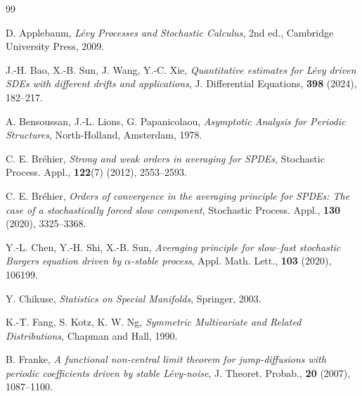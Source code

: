 \documentclass[11pt,reqno]{amsart}
\numberwithin{equation}{section}
\begin{document}
\begin{thebibliography}{99}
	
	
	 D. Applebaum, \textit{Lévy Processes and Stochastic Calculus}, 2nd ed., Cambridge University Press, 2009.
	
	 J.-H. Bao, X.-B. Sun, J. Wang, Y.-C. Xie, \textit{Quantitative estimates for Lévy driven SDEs with different drifts and applications}, J. Differential Equations, \textbf{398} (2024), 182–217.
	
	 A. Bensoussan, J.-L. Lions, G. Papanicolaou, \textit{Asymptotic Analysis for Periodic Structures}, North-Holland, Amsterdam, 1978.
	
	 C. E. Bréhier, \textit{Strong and weak orders in averaging for SPDEs}, Stochastic Process. Appl., \textbf{122}(7) (2012), 2553–2593.
	
	 C. E. Bréhier, \textit{Orders of convergence in the averaging principle for SPDEs: The case of a stochastically forced slow component}, Stochastic Process. Appl., \textbf{130} (2020), 3325–3368.
	
	
	 Y.-L. Chen, Y.-H. Shi, X.-B. Sun, \textit{Averaging principle for slow–fast stochastic Burgers equation driven by $\alpha$-stable process}, Appl. Math. Lett., \textbf{103} (2020), 106199.
	
	 Y. Chikuse, \textit{Statistics on Special Manifolds}, Springer, 2003.
	
	
	 K.-T. Fang, S. Kotz, K. W. Ng, \textit{Symmetric Multivariate and Related Distributions}, Chapman and Hall, 1990.
	
	 B. Franke, \textit{A functional non-central limit theorem for jump-diffusions with periodic coefficients driven by stable Lévy-noise}, J. Theoret. Probab., \textbf{20} (2007), 1087–1100.
	
	

\end{thebibliography}
\end{document}
